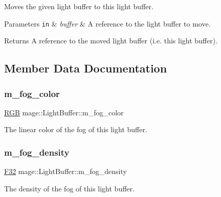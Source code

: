 Moves the given light buffer to this light buffer.


\begin{DoxyParams}[1]{Parameters}
\mbox{\tt in}  & {\em buffer} & A reference to the light buffer to move. \\
\hline
\end{DoxyParams}
\begin{DoxyReturn}{Returns}
A reference to the moved light buffer (i.\+e. this light buffer). 
\end{DoxyReturn}


\subsection{Member Data Documentation}
\hypertarget{structmage_1_1_light_buffer_a3034d4800262c53628015e057eb45ba0}{}\label{structmage_1_1_light_buffer_a3034d4800262c53628015e057eb45ba0} 
\subsubsection{\texorpdfstring{m\+\_\+fog\+\_\+color}{m\_fog\_color}}
{\footnotesize\ttfamily \hyperlink{structmage_1_1_r_g_b}{R\+GB} mage\+::\+Light\+Buffer\+::m\+\_\+fog\+\_\+color}

The linear color of the fog of this light buffer. \hypertarget{structmage_1_1_light_buffer_a1bc8ed86ac803e06e5cc3341ccbd7f2d}{}\label{structmage_1_1_light_buffer_a1bc8ed86ac803e06e5cc3341ccbd7f2d} 
\subsubsection{\texorpdfstring{m\+\_\+fog\+\_\+density}{m\_fog\_density}}
{\footnotesize\ttfamily \hyperlink{namespacemage_aa97e833b45f06d60a0a9c4fc22ae02c0}{F32} mage\+::\+Light\+Buffer\+::m\+\_\+fog\+\_\+density}

The density of the fog of this light buffer. \hypertarget{structmage_1_1_light_buffer_a17de50056bd78d5081f9302257b988de}{}\label{structmage_1_1_light_buffer_a17de50056bd78d5081f9302257b988de} 
